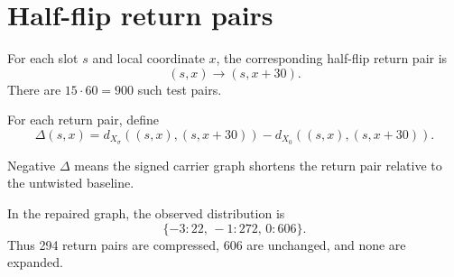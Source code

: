 \section{Half-flip return pairs}

\begin{definition}
For each slot \(s\) and local coordinate \(x\), the corresponding half-flip return pair is
\[
    (s,x) \longrightarrow (s,x+30).
\]
There are \(15\cdot 60=900\) such test pairs.
\end{definition}

For each return pair, define
\[
    \Delta(s,x)
    =
    d_{X_\sigma}((s,x),(s,x+30))
    -
    d_{X_0}((s,x),(s,x+30)).
\]

Negative \(\Delta\) means the signed carrier graph shortens the return pair relative to the untwisted baseline.

In the repaired graph, the observed distribution is
\[
    \{-3:22,\,-1:272,\,0:606\}.
\]
Thus 294 return pairs are compressed, 606 are unchanged, and none are expanded.
